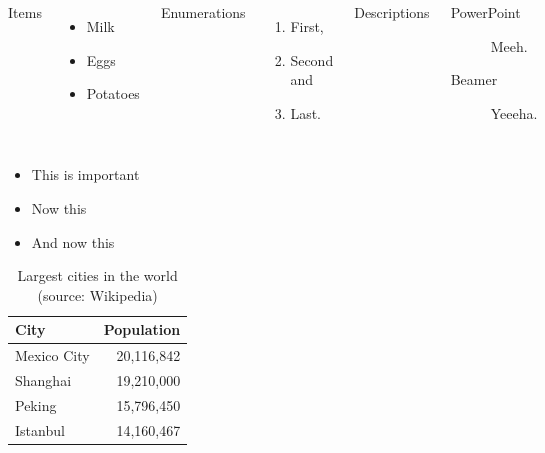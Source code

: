 \documentclass{beamer}
\newcommand{\autotitle}{\secname\ifdefempty{\subsecname}{}{~--- \subsecname}}
\begin{document}
\begin{frame}{\autotitle}
    \begin{columns}[T,onlytextwidth]
        Items
        \begin{itemize}
            \item Milk \item Eggs \item Potatoes
        \end{itemize}
        
        Enumerations
        \begin{enumerate}
            \item First, \item Second and \item Last.
        \end{enumerate}
        
        Descriptions
        \begin{description}
            \item[PowerPoint] Meeh.
            \item[Beamer] Yeeeha.
        \end{description}
    \end{columns}
\end{frame}

\begin{frame}{\autotitle}
    \begin{itemize}[<+- | alert@+>]
        \item \alert<4>{This is important}
        \item Now this
        \item And now this
    \end{itemize}
\end{frame}

\begin{frame}{\autotitle}
    \begin{table}
        \caption{Largest cities in the world (source: Wikipedia)}
        \begin{tabular}{@{} lr @{}}
            \toprule
            City & Population\\
            \midrule
            Mexico City & 20,116,842\\
            Shanghai & 19,210,000\\
            Peking & 15,796,450\\
            Istanbul & 14,160,467\\
            \bottomrule
        \end{tabular}
    \end{table}
\end{frame}
\end{document}
